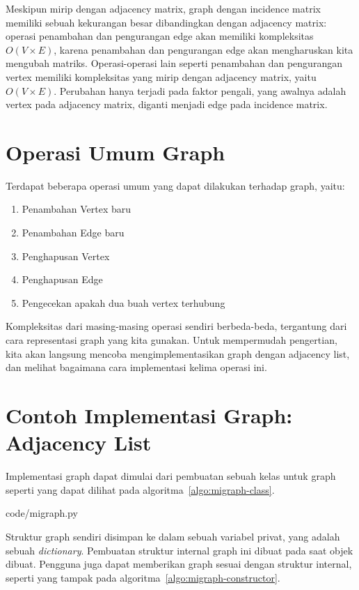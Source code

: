 Meskipun mirip dengan adjacency matrix, graph dengan incidence matrix memiliki sebuah kekurangan besar dibandingkan dengan adjacency matrix: operasi penambahan dan pengurangan edge akan memiliki kompleksitas $O(V \times E)$, karena penambahan dan pengurangan edge akan mengharuskan kita mengubah matriks. Operasi-operasi lain seperti penambahan dan pengurangan vertex memiliki kompleksitas yang mirip dengan adjacency matrix, yaitu $O(V \times E)$. Perubahan hanya terjadi pada faktor pengali, yang awalnya adalah vertex pada adjacency matrix, diganti menjadi edge pada incidence matrix.

\section{Operasi Umum Graph}

Terdapat beberapa operasi umum yang dapat dilakukan terhadap graph, yaitu:

\begin{enumerate}
    \item Penambahan Vertex baru
    \item Penambahan Edge baru
    \item Penghapusan Vertex
    \item Penghapusan Edge
    \item Pengecekan apakah dua buah vertex terhubung
\end{enumerate}

Kompleksitas dari masing-masing operasi sendiri berbeda-beda, tergantung dari cara representasi graph yang kita gunakan. Untuk mempermudah pengertian, kita akan langsung mencoba mengimplementasikan graph dengan adjacency list, dan melihat bagaimana cara implementasi kelima operasi ini.

\section{Contoh Implementasi Graph: Adjacency List}

Implementasi graph dapat dimulai dari pembuatan sebuah kelas untuk graph seperti yang dapat dilihat pada algoritma~\ref{algo:migraph-class}.


                {code/migraph.py}

Struktur graph sendiri disimpan ke dalam sebuah variabel privat, yang adalah sebuah \textit{dictionary}. Pembuatan struktur internal graph ini dibuat pada saat objek dibuat. Pengguna juga dapat memberikan graph sesuai dengan struktur internal, seperti yang tampak pada algoritma~\ref{algo:migraph-constructor}.

